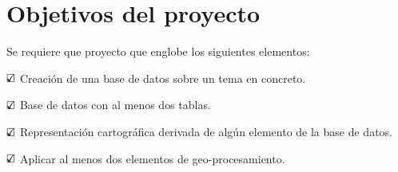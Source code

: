 
\section{Objetivos del proyecto}

Se requiere que proyecto que englobe los siguientes elementos:

$\text{\rlap{$\checkmark$}}\square$ Creación de una base de datos sobre un tema
en concreto.

$\text{\rlap{$\checkmark$}}\square$ Base de datos con al menos dos tablas.

$\text{\rlap{$\checkmark$}}\square$ Representación cartográfica derivada de
algún elemento de la base de datos.

$\text{\rlap{$\checkmark$}}\square$ Aplicar al menos dos elementos de
geo-procesamiento.
